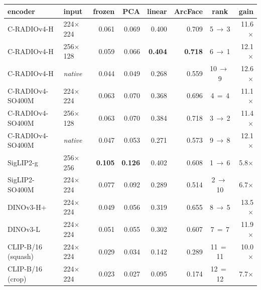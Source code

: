 \begin{tabular}{llrrrrcr}
\toprule
encoder & input & frozen & PCA & linear & ArcFace & rank & gain \\
\midrule
C-RADIOv4-H & 224$\times$224 & 0.061 & 0.069 & 0.400 & 0.709 & 5\,$\to$\,3 & 11.6$\times$ \\
C-RADIOv4-H & 256$\times$128 & 0.059 & 0.066 & \textbf{0.404} & \textbf{0.718} & 6\,$\to$\,1 & 12.1$\times$ \\
C-RADIOv4-H & \textit{native} & 0.044 & 0.049 & 0.268 & 0.559 & 10\,$\to$\,9 & 12.6$\times$ \\
C-RADIOv4-SO400M & 224$\times$224 & 0.063 & 0.070 & 0.368 & 0.696 & 4\,$=$\,4 & 11.1$\times$ \\
C-RADIOv4-SO400M & 256$\times$128 & 0.063 & 0.070 & 0.384 & 0.718 & 3\,$\to$\,2 & 11.4$\times$ \\
C-RADIOv4-SO400M & \textit{native} & 0.047 & 0.053 & 0.271 & 0.573 & 9\,$\to$\,8 & 12.1$\times$ \\
SigLIP2-g & 256$\times$256 & \textbf{0.105} & \textbf{0.126} & 0.402 & 0.608 & 1\,$\to$\,6 & 5.8$\times$ \\
SigLIP2-SO400M & 224$\times$224 & 0.077 & 0.092 & 0.289 & 0.514 & 2\,$\to$\,10 & 6.7$\times$ \\
DINOv3-H+ & 224$\times$224 & 0.049 & 0.056 & 0.319 & 0.655 & 8\,$\to$\,5 & 13.5$\times$ \\
DINOv3-L & 224$\times$224 & 0.051 & 0.055 & 0.302 & 0.607 & 7\,$=$\,7 & 11.9$\times$ \\
CLIP-B/16 (squash) & 224$\times$224 & 0.029 & 0.034 & 0.142 & 0.289 & 11\,$=$\,11 & 10.0$\times$ \\
CLIP-B/16 (crop) & 224$\times$224 & 0.023 & 0.027 & 0.095 & 0.174 & 12\,$=$\,12 & 7.7$\times$ \\
\bottomrule
\end{tabular}
